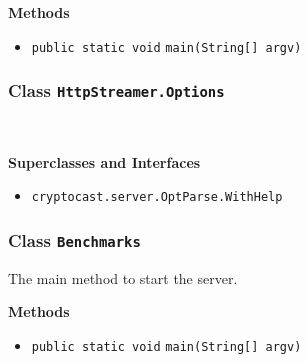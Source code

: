 \textbf{\sffamily Methods}
\begin{itemize}
\item \lstinline|public static void| \lstinline|main|\lstinline|(String[] argv)| \\[-0.6em]




\end{itemize}

\subsubsection{Class \lstinline|HttpStreamer.Options|}
 \\
\noindent\begin{minipage}[t]{5cm}
\vspace{0.3em}
\hspace*{2em}
\vspace{0.3em}
\end{minipage}



\textbf{\sffamily Superclasses and Interfaces}
\begin{itemize}
\item \lstinline|cryptocast.server.OptParse.WithHelp|
\end{itemize}



\subsubsection{Class \lstinline|Benchmarks|}
The main method to start the server. \\
\noindent\begin{minipage}[t]{5cm}
\vspace{0.3em}
\hspace*{2em}
\vspace{0.3em}
\end{minipage}





\textbf{\sffamily Methods}
\begin{itemize}
\item \lstinline|public static void| \lstinline|main|\lstinline|(String[] argv)| \\[-0.6em]




\end{itemize}

